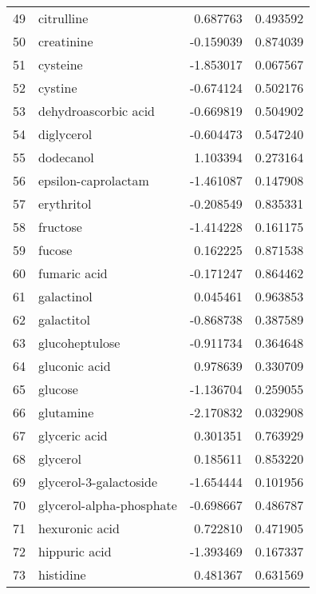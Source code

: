 \begin{tabular}{llrr}
49  &                         citrulline &  0.687763 &  0.493592 \\
50  &                         creatinine & -0.159039 &  0.874039 \\
51  &                           cysteine & -1.853017 &  0.067567 \\
52  &                            cystine & -0.674124 &  0.502176 \\
53  &               dehydroascorbic acid & -0.669819 &  0.504902 \\
54  &                         diglycerol & -0.604473 &  0.547240 \\
55  &                          dodecanol &  1.103394 &  0.273164 \\
56  &                epsilon-caprolactam & -1.461087 &  0.147908 \\
57  &                         erythritol & -0.208549 &  0.835331 \\
58  &                           fructose & -1.414228 &  0.161175 \\
59  &                             fucose &  0.162225 &  0.871538 \\
60  &                       fumaric acid & -0.171247 &  0.864462 \\
61  &                         galactinol &  0.045461 &  0.963853 \\
62  &                         galactitol & -0.868738 &  0.387589 \\
63  &                     glucoheptulose & -0.911734 &  0.364648 \\
64  &                      gluconic acid &  0.978639 &  0.330709 \\
65  &                            glucose & -1.136704 &  0.259055 \\
66  &                          glutamine & -2.170832 &  0.032908 \\
67  &                      glyceric acid &  0.301351 &  0.763929 \\
68  &                           glycerol &  0.185611 &  0.853220 \\
69  &             glycerol-3-galactoside & -1.654444 &  0.101956 \\
70  &           glycerol-alpha-phosphate & -0.698667 &  0.486787 \\
71  &                     hexuronic acid &  0.722810 &  0.471905 \\
72  &                      hippuric acid & -1.393469 &  0.167337 \\
73  &                          histidine &  0.481367 &  0.631569 \\

\end{tabular}
